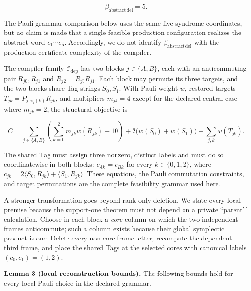 \documentclass[
  11pt,
]{article}
\begin{document}
\[
\beta_{\mathrm{abstract\,del}}=5.
\]

The Pauli-grammar comparison below uses the same five syndrome
coordinates, but no claim is made that a single feasible production
configuration realizes the abstract word \(e_1\cdots e_5\). Accordingly,
we do not identify \(\beta_{\mathrm{abstract\,del}}\) with the
production certificate complexity of the compiler.

The compiler family \(\mathcal C_{\mathrm{dep}}\) has two blocks
\(j\in\{A,B\}\), each with an anticommuting pair \(R_{j0},R_{j1}\) and
\(R_{j2}=R_{j0}R_{j1}\). Each block may permute its three targets, and
the two blocks share Tag strings \(S_0,S_1\). With Pauli weight \(w\),
restored targets \(T_{jk}=P_{j,\pi_j(k)}R_{jk}\), and multipliers
\(m_{jk}=4\) except for the declared central case where \(m_{jk}=2\),
the structural objective is

\[
C=\sum_{j\in\{A,B\}}\left(\sum_{k=0}^2m_{jk}w(R_{jk})-10\right)
  +2\bigl(w(S_0)+w(S_1)\bigr)+\sum_{j,k}w(T_{jk}).
\]

The shared Tag must assign three nonzero, distinct labels and must do so
coordinatewise in both blocks: \(c_{Ak}=c_{Bk}\) for every
\(k\in\{0,1,2\}\), where
\(c_{jk}=2\langle S_0,R_{jk}\rangle+\langle S_1,R_{jk}\rangle\). These
equations, the Pauli commutation constraints, and target permutations
are the complete feasibility grammar used here.

A stronger transformation goes beyond rank-only deletion. We state every
local premise because the support-one theorem must not depend on a
private ``parent'\,' calculation. Choose in each block a \emph{core}
column on which the two independent frames anticommute; such a column
exists because their global symplectic product is one. Delete every
non-core frame letter, recompute the dependent third frame, and place
the shared Tags at the selected cores with canonical labels
\((c_0,c_1)=(1,2)\).

\textbf{Lemma 3 (local reconstruction bounds).} The following bounds
hold for every local Pauli choice in the declared grammar.
\end{document}
